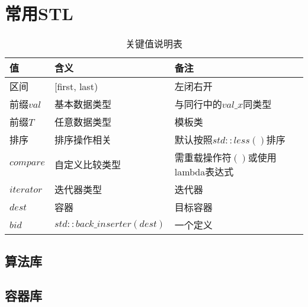 \section{常用STL}

\begin{table}[htbp]
  \centering
  \caption{关键值说明表}
  \begin{tabularx}{\textwidth}{>{\raggedright\arraybackslash}X >{\centering\arraybackslash}X >{\raggedleft\arraybackslash}X}
    \toprule
    \rowcolor{headerbg}
    \textbf{值} & \textbf{含义} & \textbf{备注} \\
    \midrule
    区间 & [first, last) & 左闭右开 \\
    前缀$val$ & 基本数据类型 & 与同行中的$val\_x$同类型 \\
    前缀$T$ & 任意数据类型 & 模板类 \\
    排序 & 排序操作相关 & 默认按照$std::less()$排序 \\
    $compare$ & 自定义比较类型 & 需重载操作符$()$或使用lambda表达式 \\
    $iterator$ & 迭代器类型 & 迭代器 \\
    $dest$ & 容器 & 目标容器 \\
    $bid$ & $std::back\_inserter(dest)$ & 一个定义 \\
    \bottomrule
  \end{tabularx}
\end{table}



\subsection{算法库}



\subsection{容器库}

